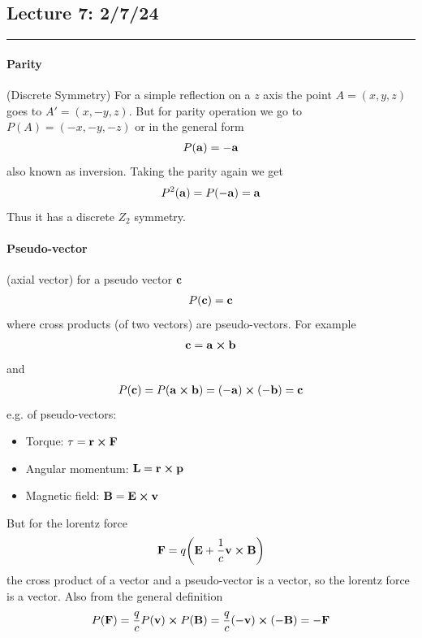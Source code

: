 \documentclass[../main.tex]{subfiles}
\begin{document}
\newpage
\subsection*{Lecture 7: \hfill  2/7/24}
\hrule \vspace{10px}

\paragraph*{Parity} (Discrete Symmetry) For a simple reflection on a $z$ axis
the point $A=(x, y, z)$ goes to $A' = (x, -y, z)$. But for parity operation we go to
$P(A) = (-x, -y, -z)$ or in the general form
\begin{align*}
    P(\vb{a}) = -\vb{a}
\end{align*}
also known as inversion. Taking the parity again we get
\begin{align*}
    P^2(\vb{a}) = P(-\vb{a}) = \vb{a}
\end{align*}
Thus it has a discrete $Z_2$ symmetry.

\paragraph*{Pseudo-vector} (axial vector) for a pseudo vector $\vb{c}$
\begin{align*}
    P(\vb{c}) = \vb{c}
\end{align*}
where cross products (of two vectors) are pseudo-vectors. For example
\begin{align*}
    \vb{c} = \vb{a} \cross \vb{b}
\end{align*}
and
\begin{align*}
    P(\vb{c}) = P(\vb{a} \cross \vb{b}) = (-\vb{a}) \cross (-\vb{b}) = \vb{c}
\end{align*}
e.g. of pseudo-vectors:
\begin{itemize}
    \item Torque: $\vb{\tau} = \vb{r} \cross \vb{F}$
    \item Angular momentum: $\vb{L} = \vb{r} \cross \vb{p}$
    \item Magnetic field: $\vb{B} = \vb{E} \cross \vb{v}$
\end{itemize}
But for the lorentz force 
\begin{align*}
    \vb{F} = q \qt(\vb{E} + \frac{1}{c} \vb{v} \cross \vb{B})
\end{align*}
the cross product of a vector and a pseudo-vector is a vector, so the lorentz force is a vector. 
Also from the general definition
\begin{align*}
    P(\vb{F}) = \frac{q}{c} P(\vb{v}) \cross P(\vb{B}) = \frac{q}{c} (-\vb{v}) \cross (-\vb{B}) = - \vb{F}
\end{align*}
\end{document}
